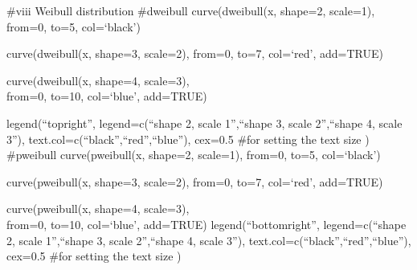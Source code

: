 \documentclass[
]{article}
\begin{document}
\#viii Weibull distribution \#dweibull curve(dweibull(x, shape=2,
scale=1), from=0, to=5, col=`black')

curve(dweibull(x, shape=3, scale=2), from=0, to=7, col=`red', add=TRUE)

curve(dweibull(x, shape=4, scale=3),\\
from=0, to=10, col=`blue', add=TRUE)

legend(``topright'', legend=c(``shape 2, scale 1'',``shape 3, scale
2'',``shape 4, scale 3''), text.col=c(``black'',``red'',``blue''),
cex=0.5 \#for setting the text size ) \#pweibull curve(pweibull(x,
shape=2, scale=1), from=0, to=5, col=`black')

curve(pweibull(x, shape=3, scale=2), from=0, to=7, col=`red', add=TRUE)

curve(pweibull(x, shape=4, scale=3),\\
from=0, to=10, col=`blue', add=TRUE) legend(``bottomright'',
legend=c(``shape 2, scale 1'',``shape 3, scale 2'',``shape 4, scale
3''), text.col=c(``black'',``red'',``blue''), cex=0.5 \#for setting the
text size )
\end{document}
